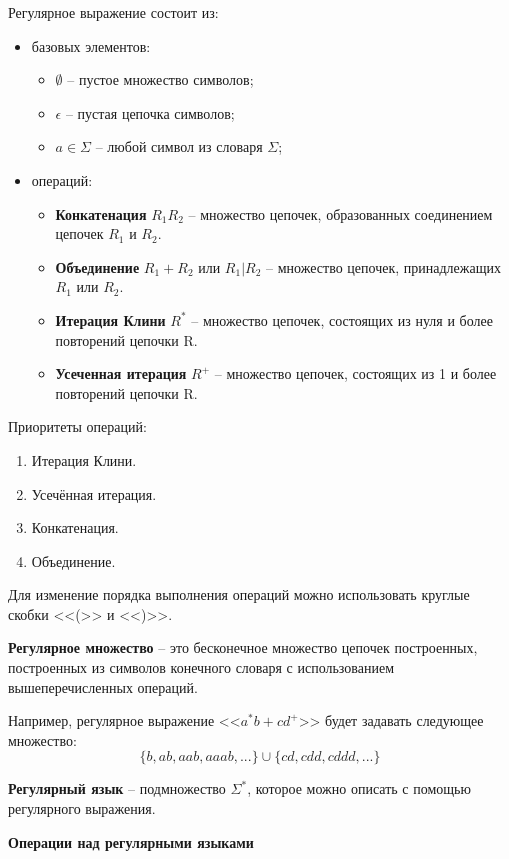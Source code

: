 \documentclass[a4paper,final]{article}
\begin{document}
Регулярное выражение состоит из:
\begin{itemize}
    \item базовых элементов:
    \begin{itemize}
        \item $\emptyset$ -- пустое множество символов;
        \item $\epsilon$ -- пустая цепочка символов;
        \item $a \in \Sigma$ -- любой символ из словаря $\Sigma$;
    \end{itemize}
    \item операций:
    \begin{itemize}
        \item \textbf{Конкатенация} $R_1R_2$ -- множество цепочек, образованных соединением цепочек $R_1$ и $R_2$.
        \item \textbf{Объединение} $R_1 + R_2$ или $R_1 | R_2$ -- множество цепочек, принадлежащих $R_1$ или $R_2$.
        \item \textbf{Итерация Клини} $R^*$ -- множество цепочек, состоящих из нуля и более повторений цепочки R.
        \item \textbf{Усеченная итерация} $R^+$ -- множество цепочек, состоящих из 1 и более повторений цепочки R.
    \end{itemize}
\end{itemize}

Приоритеты операций:
\begin{enumerate}
    \item Итерация Клини.
    \item Усечённая итерация.
    \item Конкатенация.
    \item Объединение.
\end{enumerate}

Для изменение порядка выполнения операций можно использовать круглые скобки <<(>> и <<)>>.


\textbf{Регулярное множество} -- это бесконечное множество цепочек построенных, построенных из символов конечного словаря с использованием вышеперечисленных операций.

Например, регулярное выражение <<$a^*b + cd^+$>> будет задавать следующее множество:$$\{b, ab, aab, aaab, ...\} \cup \{ cd, cdd, cddd, ... \}$$

\textbf{Регулярный язык} -- подмножество $\Sigma^*$, которое можно описать с помощью регулярного выражения.

\textbf{Операции над регулярными языками}
\end{document}

